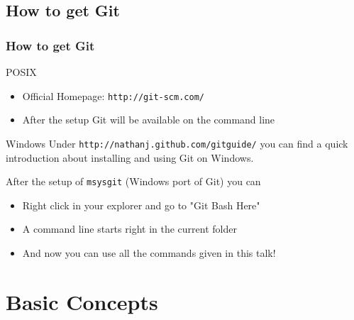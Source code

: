 \documentclass{beamer}
\begin{document}
\subsection{How to get Git}
\frame
{
  \frametitle{How to get Git}
  \begin{block}{POSIX}
    \begin{itemize}
      \item Official Homepage: \texttt{http://git-scm.com/}
      \item After the setup Git will be available on the command line
    \end{itemize}

  \end{block}
  \begin{block}{Windows}
    Under \texttt{http://nathanj.github.com/gitguide/} you can find a quick introduction about installing and using Git on Windows.\smallskip

    After the setup of \texttt{msysgit} (Windows port of Git) you can 
    \begin{itemize}
      \item Right click in your explorer and go to "Git Bash Here"
      \item A command line starts right in the current folder
      \item And now you can use all the commands given in this talk!
    \end{itemize}
  \end{block}
}
\section{Basic Concepts}
\end{document}
